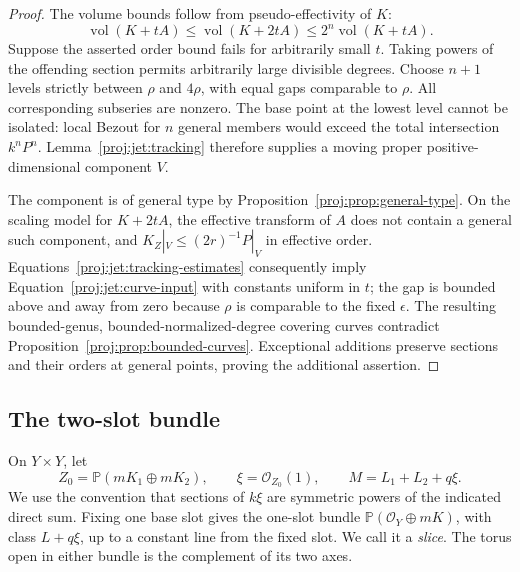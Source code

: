 \documentclass[11pt,letterpaper]{article}
\theoremstyle{definition}
\theoremstyle{remark}
\begin{document}
\begin{proof}
The volume bounds follow from pseudo-effectivity of \(K\):
\[
 \operatorname{vol}(K+tA)\le\operatorname{vol}(K+2tA)\le2^n\operatorname{vol}(K+tA).
\]
Suppose the asserted order bound fails for arbitrarily small \(t\).
Taking powers of the offending section permits arbitrarily large
divisible degrees.  Choose \(n+1\) levels strictly between \(\rho\)
and \(4\rho\), with equal gaps comparable to \(\rho\).
All corresponding subseries are nonzero.  The base point at the
lowest level cannot be isolated: local Bezout for \(n\) general
members would exceed the total intersection \(k^nP^n\).
Lemma~\ref{proj:jet:tracking} therefore supplies a moving proper
positive-dimensional component \(V\).

The component is of general type by
Proposition~\ref{proj:prop:general-type}.  On the scaling model for
\(K+2tA\), the effective transform of \(A\) does not contain a
general such component, and
\(K_Z|_V\le(2r)^{-1}P|_V\) in effective order.
Equations~\eqref{proj:jet:tracking-estimates} consequently imply
Equation~\eqref{proj:jet:curve-input} with constants uniform in \(t\);
the gap is bounded above and away from zero because
\(\rho\) is comparable to the fixed \(\epsilon\).
The resulting bounded-genus, bounded-normalized-degree covering
curves contradict Proposition~\ref{proj:prop:bounded-curves}.
Exceptional additions preserve sections and their orders at
general points, proving the additional assertion.
\end{proof}

\subsection{The two-slot bundle}

On \(Y\times Y\), let
\begin{equation}\label{proj:jet:two-slot}
 Z_0=\mathbb{P}(mK_1\oplus mK_2),\qquad
 \xi=\mathcal{O}_{Z_0}(1),\qquad M=L_1+L_2+q\xi.
\end{equation}
We use the convention that sections of \(k\xi\) are symmetric powers
of the indicated direct sum.  Fixing one base slot gives the
one-slot bundle
\(\mathbb{P}(\mathcal{O}_Y\oplus mK)\), with class \(L+q\xi\), up to a constant
line from the fixed slot.  We call it a \emph{slice}.
The torus open in either bundle is the complement of its two axes.
\end{document}
